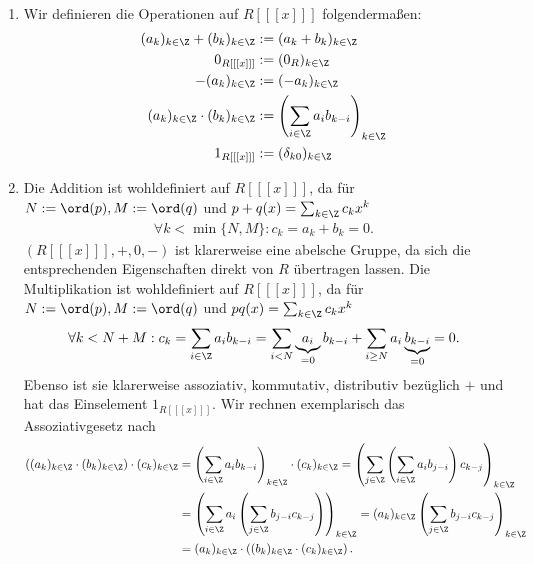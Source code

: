 \begin{solution}
\leavevmode \\
\begin{enumerate}
  \item Wir definieren die Operationen auf $R[[[x]]]$ folgendermaßen:
  \begin{align*}
    (a_k)_{k \in \Z} + (b_k)_{k \in \Z} &:= (a_k + b_k)_{k \in \Z} \\
    0_{R[[[x]]]} &:= (0_R)_{k \in \Z} \\
    -(a_k)_{k \in \Z} &:= (-a_k)_{k \in \Z} \\
    (a_k)_{k \in \Z} \cdot (b_k)_{k \in \Z} &:= \left(\sum_{i \in \Z}a_ib_{k-i}\right)_{k \in \Z} \\
    1_{R[[[x]]]} &:= (\delta_{k0})_{k \in \Z}
  \end{align*}
  \item Die Addition ist wohldefiniert auf $R[[[x]]]$, da für $N := \ord(p), M := \ord(q)$
  und $p+q(x) = \sum_{k \in \Z}c_kx^k$
  \begin{align*}
    \forall k < \min\{N,M\}: c_k = a_k + b_k = 0.
  \end{align*}
  $(R[[[x]]],+,0,-)$ ist klarerweise eine abelsche Gruppe, da sich die
  entsprechenden Eigenschaften direkt von $R$ übertragen lassen.
  Die Multiplikation ist wohldefiniert auf $R[[[x]]]$, da für $N := \ord(p), M := \ord(q)$
  und $pq(x) = \sum_{k \in \Z}c_kx^k$
  \begin{align*}
    \forall k < N + M: c_k = \sum_{i \in \Z}a_ib_{k-i}
    = \sum_{i < N}\underbrace{a_i}_{=0}b_{k-i} + \sum_{i \geq N}a_i\underbrace{b_{k-i}}_{=0} = 0.
  \end{align*}
  Ebenso ist sie klarerweise assoziativ, kommutativ, distributiv bezüglich $+$
  und hat das Einselement $1_{R[[[x]]]}$.
  Wir rechnen exemplarisch das Assoziativgesetz nach
  \begin{align*}
    \left((a_k)_{k \in \Z} \cdot (b_k)_{k \in \Z}\right) \cdot (c_k)_{k \in \Z}
    &= \left(\sum_{i \in \Z}a_i b_{k-i}\right)_{k \in \Z}\cdot (c_k)_{k \in \Z}
    = \left(\sum_{j \in \Z} \left( \sum_{i \in \Z}a_i b_{j-i}\right)c_{k-j}\right)_{k \in \Z} \\
    &= \left(\sum_{i \in \Z}a_i\left(\sum_{j \in \Z} b_{j-i} c_{k-j}\right)\right)_{k \in \Z}
    = (a_k)_{k \in \Z}\left(\sum_{j \in \Z} b_{j-i} c_{k-j}\right)_{k \in \Z} \\
    &= (a_k)_{k \in \Z} \cdot \left((b_k)_{k \in \Z} \cdot (c_k)_{k \in \Z}\right).
  \end{align*}

\end{enumerate}
\end{solution}
